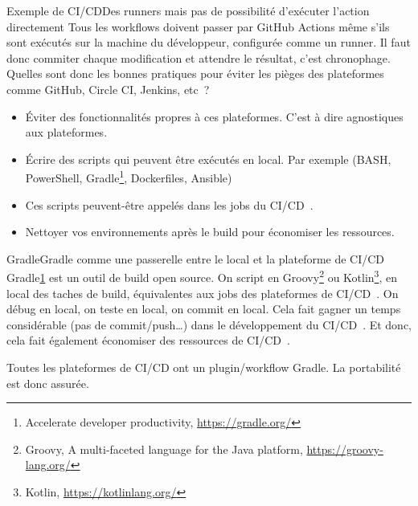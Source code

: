 \documentclass{beamer}
\begin{document}
    \begin{frame}{Exemple de CI/CD}{Des runners mais pas de possibilité d'exécuter l'action directement}
        \transdissolve
        Tous les workflows doivent passer par GitHub Actions même s'ils sont exécutés sur la machine du développeur, configurée comme un runner.
        Il faut donc commiter chaque modification et attendre le résultat, c'est chronophage.
        \bigbreak
        Quelles sont donc les bonnes pratiques pour éviter les pièges des plateformes comme GitHub, Circle CI, Jenkins, etc~?
        \pause
        \begin{itemize}
            \item Éviter des fonctionnalités propres à ces plateformes.
            C'est à dire agnostiques aux plateformes.
            \item Écrire des scripts qui peuvent être exécutés en local.
            Par exemple (BASH, PowerShell, Gradle\footnote{\label{gradle}Accelerate developer productivity, \url{https://gradle.org/}}, Dockerfiles, Ansible)
            \item Ces scripts peuvent-être appelés dans les jobs du CI/CD~.
            \item Nettoyer vos environnements après le build pour économiser les ressources.
        \end{itemize}
    \end{frame}

    \begin{frame}{Gradle}{Gradle comme une passerelle entre le local et la plateforme de CI/CD}
        \transdissolve
        Gradle\cref{gradle} est un outil de build open source.
        On script en Groovy\footnote{\label{groovy}Groovy, A multi-faceted language for the Java platform, \url{https://groovy-lang.org/}} ou Kotlin\footnote{Kotlin, \url{https://kotlinlang.org/}}, en local des taches de build, équivalentes aux jobs des plateformes de CI/CD~.
        \bigbreak
        On débug en local, on teste en local, on commit en local.
        Cela fait gagner un temps considérable (pas de commit/push\ldots) dans le développement du CI/CD~.
        Et donc, cela fait également économiser des ressources de CI/CD~.
        \begin{dangercolorbox}
            Toutes les plateformes de CI/CD ont un plugin/workflow Gradle.
            La portabilité est donc assurée.
        \end{dangercolorbox}
    \end{frame}
\end{document}
